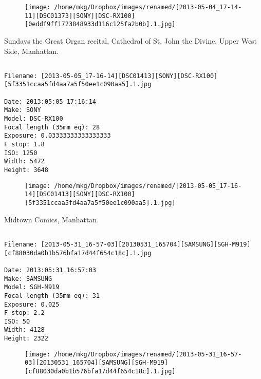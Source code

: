 \begin{figure}
\texttt{[image: /home/mkg/Dropbox/images/renamed/[2013-05-04\_17-14-11][DSC01373][SONY][DSC-RX100][0eddf9ff1723848933d116c125fa2b0b].1.jpg]}
\end{figure}
    
\clearpage
\onecolumn
\noindent Sundays the Great Organ recital, Cathedral of St. John the Divine, Upper West Side, Manhattan.
\noindent
\begin{lstlisting}

Filename: [2013-05-05_17-16-14][DSC01413][SONY][DSC-RX100][5f3351ccaa5fd4aa7a5f50ee1c090aa5].1.jpg

Date: 2013:05:05 17:16:14
Make: SONY
Model: DSC-RX100
Focal length (35mm eq): 28
Exposure: 0.03333333333333333
F stop: 1.8
ISO: 1250
Width: 5472
Height: 3648
\end{lstlisting}
\clearpage

\begin{figure}
\texttt{[image: /home/mkg/Dropbox/images/renamed/[2013-05-05\_17-16-14][DSC01413][SONY][DSC-RX100][5f3351ccaa5fd4aa7a5f50ee1c090aa5].1.jpg]}
\end{figure}
    
\clearpage
\onecolumn
\noindent Midtown Comics, Manhattan.
\noindent
\begin{lstlisting}

Filename: [2013-05-31_16-57-03][20130531_165704][SAMSUNG][SGH-M919][cf88030da0b1b576bfa17d44f654c18c].1.jpg

Date: 2013:05:31 16:57:03
Make: SAMSUNG
Model: SGH-M919
Focal length (35mm eq): 31
Exposure: 0.025
F stop: 2.2
ISO: 50
Width: 4128
Height: 2322
\end{lstlisting}
\clearpage

\begin{figure}
\texttt{[image: /home/mkg/Dropbox/images/renamed/[2013-05-31\_16-57-03][20130531\_165704][SAMSUNG][SGH-M919][cf88030da0b1b576bfa17d44f654c18c].1.jpg]}
\end{figure}
    

